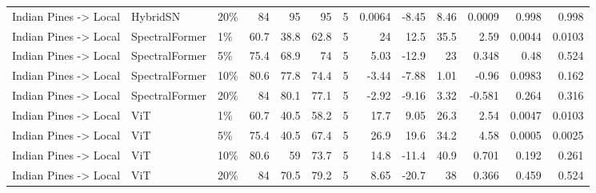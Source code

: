 \begin{table}
\begin{tabular}{lllrrrrrrrrrr}
Indian Pines -> Local & HybridSN & 20\% & 84 & 95 & 95 & 5 & 0.0064 & -8.45 & 8.46 & 0.0009 & 0.998 & 0.998 \\
Indian Pines -> Local & SpectralFormer & 1\% & 60.7 & 38.8 & 62.8 & 5 & 24 & 12.5 & 35.5 & 2.59 & 0.0044 & 0.0103 \\
Indian Pines -> Local & SpectralFormer & 5\% & 75.4 & 68.9 & 74 & 5 & 5.03 & -12.9 & 23 & 0.348 & 0.48 & 0.524 \\
Indian Pines -> Local & SpectralFormer & 10\% & 80.6 & 77.8 & 74.4 & 5 & -3.44 & -7.88 & 1.01 & -0.96 & 0.0983 & 0.162 \\
Indian Pines -> Local & SpectralFormer & 20\% & 84 & 80.1 & 77.1 & 5 & -2.92 & -9.16 & 3.32 & -0.581 & 0.264 & 0.316 \\
Indian Pines -> Local & ViT & 1\% & 60.7 & 40.5 & 58.2 & 5 & 17.7 & 9.05 & 26.3 & 2.54 & 0.0047 & 0.0103 \\
Indian Pines -> Local & ViT & 5\% & 75.4 & 40.5 & 67.4 & 5 & 26.9 & 19.6 & 34.2 & 4.58 & 0.0005 & 0.0025 \\
Indian Pines -> Local & ViT & 10\% & 80.6 & 59 & 73.7 & 5 & 14.8 & -11.4 & 40.9 & 0.701 & 0.192 & 0.261 \\
Indian Pines -> Local & ViT & 20\% & 84 & 70.5 & 79.2 & 5 & 8.65 & -20.7 & 38 & 0.366 & 0.459 & 0.524 \\
\bottomrule
\end{tabular}
\end{table}
